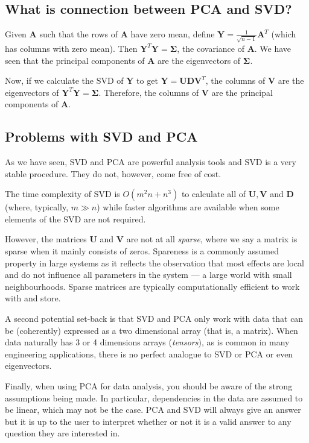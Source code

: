 \subsection{What is connection between PCA and SVD?}

Given $\mathbf A$  such that the rows of $\mathbf A$ have zero mean, define $\mathbf Y = \frac 1 {\sqrt {n-1}} \mathbf A^T$ (which has  columns with zero mean).  Then $\mathbf Y^T\mathbf Y = \mathbf \Sigma$, the covariance of $\mathbf A$.  We have seen  that the principal components of $\mathbf A$ are the eigenvectors of $\mathbf \Sigma$. 

Now, if we calculate the SVD of $\mathbf Y$ to get $\mathbf Y = \mathbf{UDV}^T$, the columns of $\mathbf V$ are the eigenvectors of $\mathbf Y^T \mathbf Y = \mathbf \Sigma$. Therefore, the columns of $\mathbf V$ are the principal components of $\mathbf A$.
 

\subsection{Problems with SVD and PCA}

As we have seen, SVD and PCA are powerful analysis tools and SVD is a very stable procedure.  They do not, however, come free of cost.  

The time complexity of SVD is $O(m^2n + n^3)$ to calculate all of $\mathbf U, \mathbf V$ and $\mathbf D$ (where, typically, $m \gg n$) while faster algorithms are available when some elements of the SVD are not required.

However, the matrices  $\mathbf{U}$ and $\mathbf{V}$ are not at all {\em sparse}, where we say a matrix is sparse when it mainly consists of zeros. Spareness is a commonly assumed property in large systems as it reflects the observation that most effects are local and do not influence all parameters in the system ---  a large world  with small neighbourhoods.  Sparse matrices are typically computationally efficient to work with and store. 

A second potential set-back is that SVD and PCA only work with data that can be (coherently) expressed as a two dimensional array (that is, a matrix).  When data naturally has 3 or 4 dimensions arrays ({\em tensors}), as is common in many engineering applications, there is no perfect analogue to SVD or PCA or even eigenvectors.  

Finally, when using PCA for data analysis,  you should be aware of the strong assumptions being made.  In particular, dependencies in the data are assumed to be linear, which may not be the case.  PCA and SVD will always give an answer but it is up to the user to interpret whether or not it is a valid answer to any question they are interested in.
   


